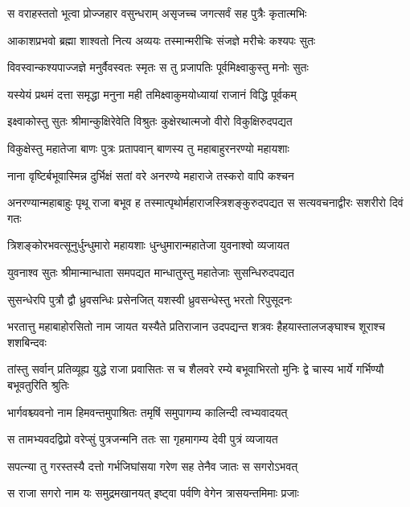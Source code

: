 \twolineshloka
{स वराहस्ततो भूत्वा प्रोज्जहार वसुन्धराम्}
{असृजच्च जगत्सर्वं सह पुत्रैः कृतात्मभिः} %

\twolineshloka
{आकाशप्रभवो ब्रह्मा शाश्वतो नित्य अव्ययः}
{तस्मान्मरीचिः संजज्ञे मरीचेः कश्यपः सुतः} %

\twolineshloka
{विवस्वान्कश्यपाज्जज्ञे मनुर्वैवस्वतः स्मृतः}
{स तु प्रजापतिः पूर्वमिक्ष्वाकुस्तु मनोः सुतः} %

\twolineshloka
{यस्येयं प्रथमं दत्ता समृद्धा मनुना मही}
{तमिक्ष्वाकुमयोध्यायां राजानं विद्धि पूर्वकम्} %

\twolineshloka
{इक्ष्वाकोस्तु सुतः श्रीमान्कुक्षिरेवेति विश्रुतः}
{कुक्षेरथात्मजो वीरो विकुक्षिरुदपद्यत} %

\twolineshloka
{विकुक्षेस्तु महातेजा बाणः पुत्रः प्रतापवान्}
{बाणस्य तु महाबाहुरनरण्यो महायशाः} %

\twolineshloka
{नाना वृष्टिर्बभूवास्मिन्न दुर्भिक्षं सतां वरे}
{अनरण्ये महाराजे तस्करो वापि कश्चन} %

\threelineshloka
{अनरण्यान्महाबाहुः पृथू राजा बभूव ह}
{तस्मात्पृथोर्महाराजस्त्रिशङ्कुरुदपद्यत}
{स सत्यवचनाद्वीरः सशरीरो दिवं गतः} %

\twolineshloka
{त्रिशङ्कोरभवत्सूनुर्धुन्धुमारो महायशाः}
{धुन्धुमारान्महातेजा युवनाश्वो व्यजायत} %

\twolineshloka
{युवनाश्व सुतः श्रीमान्मान्धाता समपद्यत}
{मान्धातुस्तु महातेजाः सुसन्धिरुदपद्यत} %

\twolineshloka
{सुसन्धेरपि पुत्रौ द्वौ ध्रुवसन्धिः प्रसेनजित्}
{यशस्वी ध्रुवसन्धेस्तु भरतो रिपुसूदनः} %

\threelineshloka
{भरतात्तु महाबाहोरसितो नाम जायत}
{यस्यैते प्रतिराजान उदपद्यन्त शत्रवः}
{हैहयास्तालजङ्घाश्च शूराश्च शशबिन्दवः} %

\threelineshloka
{तांस्तु सर्वान् प्रतिव्यूह्य युद्धे राजा प्रवासितः}
{स च शैलवरे रम्ये बभूवाभिरतो मुनिः}
{द्वे चास्य भार्ये गर्भिण्यौ बभूवतुरिति श्रुतिः} %

\twolineshloka
{भार्गवश्च्यवनो नाम हिमवन्तमुपाश्रितः}
{तमृषिं समुपागम्य कालिन्दी त्वभ्यवादयत्} %

\twolineshloka
{स तामभ्यवदद्विप्रो वरेप्सुं पुत्रजन्मनि}
{ततः सा गृहमागम्य देवी पुत्रं व्यजायत} %

\twolineshloka
{सपत्न्या तु गरस्तस्यै दत्तो गर्भजिघांसया}
{गरेण सह तेनैव जातः स सगरोऽभवत्} %

\twolineshloka
{स राजा सगरो नाम यः समुद्रमखानयत्}
{इष्ट्वा पर्वणि वेगेन त्रासयन्तमिमाः प्रजाः} %

